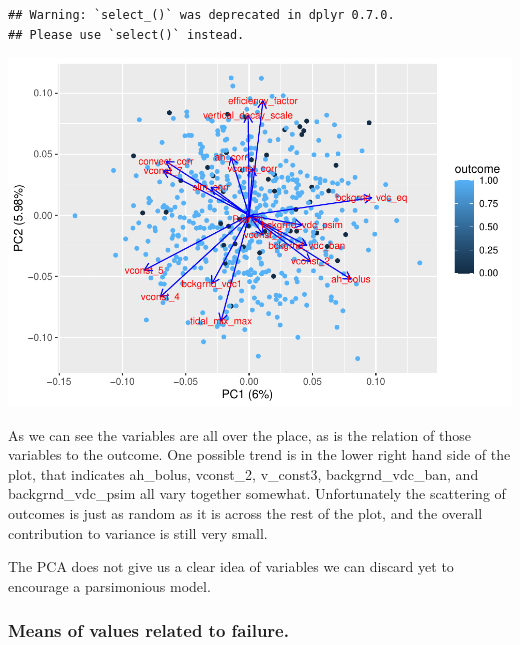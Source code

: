 \documentclass[
  11pt,
]{article}
\newenvironment{Shaded}{\begin{snugshade}}{\end{snugshade}}
\newcommand{\DataTypeTok}[1]{\textcolor[rgb]{0.13,0.29,0.53}{#1}}
\newcommand{\DecValTok}[1]{\textcolor[rgb]{0.00,0.00,0.81}{#1}}
\newcommand{\KeywordTok}[1]{\textcolor[rgb]{0.13,0.29,0.53}{\textbf{#1}}}
\newcommand{\NormalTok}[1]{#1}
\newcommand{\OperatorTok}[1]{\textcolor[rgb]{0.81,0.36,0.00}{\textbf{#1}}}
\newcommand{\StringTok}[1]{\textcolor[rgb]{0.31,0.60,0.02}{#1}}
\begin{document}
\begin{verbatim}
## Warning: `select_()` was deprecated in dplyr 0.7.0.
## Please use `select()` instead.
\end{verbatim}

\includegraphics{Project-5-MTW_files/figure-latex/unnamed-chunk-6-1.pdf}

As we can see the variables are all over the place, as is the relation
of those variables to the outcome. One possible trend is in the lower
right hand side of the plot, that indicates ah\_bolus, vconst\_2,
v\_const3, backgrnd\_vdc\_ban, and backgrnd\_vdc\_psim all vary together
somewhat. Unfortunately the scattering of outcomes is just as random as
it is across the rest of the plot, and the overall contribution to
variance is still very small.

The PCA does not give us a clear idea of variables we can discard yet to
encourage a parsimonious model.

\hypertarget{means-of-values-related-to-failure.}{%
\subsubsection{Means of values related to
failure.}\label{means-of-values-related-to-failure.}}

\begin{Shaded}
\end{Shaded}
\end{document}

